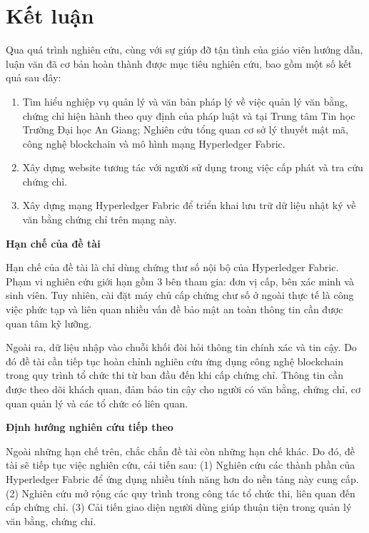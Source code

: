 \chapter{Kết luận}
Qua quá trình nghiên cứu, cùng với sự giúp đỡ tận tình của giáo viên hướng dẫn, luận văn đã cơ bản hoàn thành được mục tiêu nghiên cứu, bao gồm một số kết quả sau đây:

\begin{enumerate}

\item Tìm hiểu nghiệp vụ quản lý và văn bản pháp lý về việc quản lý văn bằng, chứng chỉ hiện hành theo quy định của pháp luật và tại Trung tâm Tin học Trường Đại học An Giang; Nghiên cứu tổng quan cơ sở lý thuyết mật mã, công nghệ blockchain và mô hình mạng Hyperledger Fabric.

\item Xây dựng website tương tác với người sử dụng trong việc cấp phát và tra cứu chứng chỉ.

\item Xây dựng mạng Hyperledger Fabric để triển khai lưu trữ dữ liệu nhật ký về văn bằng chứng chỉ trên mạng này.
\end{enumerate}

\textbf{Hạn chế của đề tài}

Hạn chế của đề tài là chỉ dùng chứng thư số nội bộ của Hyperledger Fabric. Phạm vi nghiên cứu giới hạn gồm 3 bên tham gia: đơn vị cấp, bên xác minh và sinh viên. Tuy nhiên, cài đặt máy chủ cấp chứng chư số ở ngoài thực tế là công việc phức tạp và liên quan nhiều vấn đề bảo mật an toàn thông tin cần được quan tâm kỹ lưỡng.

Ngoài ra, dữ liệu nhập vào chuỗi khối đòi hỏi thông tin chính xác và tin cậy. Do đó đề tài cần tiếp tục hoàn chỉnh nghiên cứu ứng dụng công nghệ blockchain trong quy trình tổ chức thi từ ban đầu đến khi cấp chứng chỉ. Thông tin cần được theo dõi khách quan, đảm bảo tin cậy cho người có văn bằng, chứng chỉ, cơ quan quản lý  và các tổ chức có liên quan.

\textbf{Định hướng nghiên cứu tiếp theo}

Ngoài những hạn chế trên, chắc chắn đề tài còn những hạn chế khác. Do đó, đề tài sẽ tiếp tục việc nghiên cứu, cải tiến sau: (1) Nghiên cứu các thành phần của Hyperledger Fabric để ứng dụng nhiều tính năng hơn do nền tảng này cung cấp.  (2) Nghiên cứu mở rộng các quy trình trong công tác tổ chức thi, liên quan đến cấp chứng chỉ. (3) Cải tiến giao diện người dùng giúp thuận tiện trong quản lý văn bằng, chứng chỉ.

